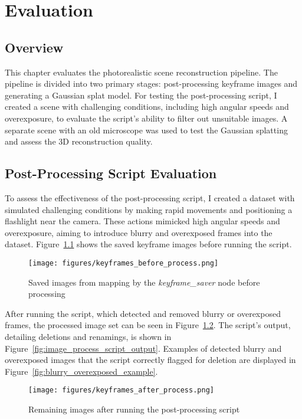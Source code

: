 \chapter{Evaluation} \label{evaluation}

\section{Overview}
This chapter evaluates the photorealistic scene reconstruction pipeline. The pipeline is divided into two primary stages: post-processing keyframe images and generating a Gaussian splat model. For testing the post-processing script, I created a scene with challenging conditions, including high angular speeds and overexposure, to evaluate the script's ability to filter out unsuitable images. A separate scene with an old microscope was used to test the Gaussian splatting and assess the 3D reconstruction quality. 

\section{Post-Processing Script Evaluation}
To assess the effectiveness of the post-processing script, I created a dataset with simulated challenging conditions by making rapid movements and positioning a flashlight near the camera. These actions mimicked high angular speeds and overexposure, aiming to introduce blurry and overexposed frames into the dataset. Figure~\ref{fig:keyframes_before_process} shows the saved keyframe images before running the script.

\FloatBarrier
\begin{figure}[htbp]
	\centering
	\texttt{[image: figures/keyframes\_before\_process.png]}
	\caption{Saved images from mapping by the \textit{keyframe\_saver} node before processing}
	\label{fig:keyframes_before_process}
\end{figure}
\FloatBarrier

After running the script, which detected and removed blurry or overexposed frames, the processed image set can be seen in Figure~\ref{fig:keyframes_after_process}. The script’s output, detailing deletions and renamings, is shown in Figure~\ref{fig:image_process_script_output}. Examples of detected blurry and overexposed images that the script correctly flagged for deletion are displayed in Figure~\ref{fig:blurry_overexposed_example}.

\FloatBarrier
\begin{figure}[htbp]
	\centering
	\texttt{[image: figures/keyframes\_after\_process.png]}
	\caption{Remaining images after running the post-processing script}
	\label{fig:keyframes_after_process}
\end{figure}

